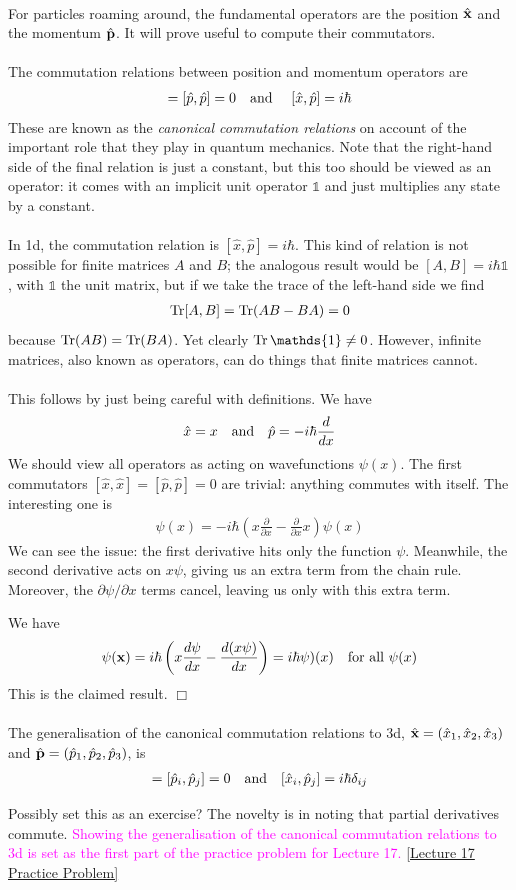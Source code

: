 \documentclass[12pt]{article}
\def\be{\begin{eqnarray}}
\def\ee{\end{eqnarray}}
\newcommand{\nn}{\nonumber}
\newcommand\para{\paragraph{}}
\newcommand{\ppp}[2]{\frac{\partial {#1}}{\partial {#2}}}
\newcommand{\co}{\color{olive}}
\newcommand{\cblue}{\color{blue}}
\newcommand{\bx}{{\bf x}}
\newcommand{\bp}{{\bf p}}
\newcommand{\alyssa}{\textcolor{magenta}}
\begin{document}
{\para
For particles roaming around,  the fundamental operators are the  position $\hat{\bx}$ and the momentum  $\hat{\bp}$. It will prove useful to compute their commutators. 
%
\\ {\ } \\ 
%
{\co {\bf Claim:} The commutation relations between position and momentum operators are
%
\be [\hat{x},\hat{x}] = [\hat{p},\hat{p}] = 0 \ \ \ {\rm and}\ \ \ \ [\hat{x},\hat{p}]= i\hbar\nn\ee
%
These are known as the {\it canonical commutation relations} on account of the important role that they play in quantum mechanics.} Note that the right-hand side of the final relation is just a constant, but this too should be viewed as an operator: it comes with an implicit unit operator $\mathds{1}$ and just multiplies any state by a constant.

\para
{\co In 1d, the commutation relation is $[\hat{x},\hat{p}]=i\hbar$. This kind of relation is not possible for finite matrices $A$ and $B$; the analogous result would be  $[A,B]=i\hbar \mathds{1}$, with $\mathds{1}$ the unit matrix, but if we take the trace of the left-hand side we find
% 
\be {\rm Tr}[A,B] = {\rm Tr}(AB-BA) = 0\nn\ee
%
because ${\rm Tr}(AB) = {\rm Tr}(BA)$. Yet clearly ${\rm Tr}\,\mathds{1} \neq 0$.} However, infinite matrices, also known as operators, can do things that finite matrices cannot.
%
\\ {\ } \\ 
%
{\co {\bf Proof:} This follows by just being careful with definitions. We have
%
\be \hat{x} = x\ \ \ {\rm and}\ \ \  \hat{p} = -i\hbar \frac{d}{dx}\nn\ee
%
We should view all operators as acting on wavefunctions $\psi(x)$. The first commutators $[\hat{x},\hat{x}] = [\hat{p},\hat{p}]=0$ are trivial: anything commutes with itself. The interesting one is
%
\be  [\hat{x},\hat{p}]\psi(x) = -i\hbar\left(x\ppp{}{x} - \ppp{}{x}{x}\right)\psi(x) \nn\ee
%
}
We can see the issue: the first derivative hits only the function $\psi$. Meanwhile, the second derivative acts on $x\psi$, giving us an extra term from the chain rule. Moreover, the $\partial \psi/\partial x$ terms cancel, leaving us only with this extra term. {\co We have
%
\be   [\hat{x},\hat{p}]\psi(\bx) = i\hbar \left(x\frac{d\psi}{dx} - \frac{d(x\psi)}{dx}\right)  = i\hbar \psi)(x) \ \ \ \mbox{for all $\psi(x)$}\nn\ee
%
This is the claimed result. \hfill $\Box$

\para
The generalisation of the canonical commutation relations to 3d, 
 $\hat{\bx} = (\hat{x}_1,\hat{x}_2,\hat{x}_3)$ and $\hat{\bp} = (\hat{p}_1,\hat{p}_2,\hat{p}_3)$, is
%
\be [\hat{x}_i,\hat{x}_j] = [\hat{p}_i,\hat{p}_j] = 0\ \ \ {\rm and}\ \ \ [\hat{x}_i,\hat{p}_j] = i\hbar \delta_{ij}\nn\ee
%
}{\cblue Possibly set this as an exercise? The novelty is in noting that partial derivatives commute.} \alyssa{Showing the generalisation of the canonical commutation relations to 3d is set as the first part of the practice problem for Lecture 17. \href{https://drive.google.com/file/d/1RcCfNfrKIEmnRbL_AyJe6mOLPKukT4Fm/view?usp=drive_link}{[Lecture 17 Practice Problem]}}



}
\end{document}
